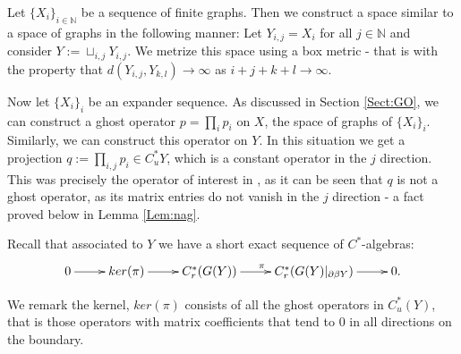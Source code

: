 \documentclass[11pt]{amsart}
\theoremstyle{plain}
\theoremstyle{definition}%
\theoremstyle{remark}%
\begin{document}
Let $\lbrace X_{i} \rbrace_{i \in \mathbb{N}}$ be a sequence of finite graphs. Then we construct a space similar to a space of graphs in the following manner: Let $Y_{i,j} = X_{i}$ for all $j \in \mathbb{N}$ and consider $Y:= \sqcup_{i,j} Y_{i,j}$. We metrize this space using a box metric - that is with the property that $d(Y_{i,j},Y_{k,l}) \rightarrow \infty$ as $i+j+k+l \rightarrow \infty$. 

Now let $\lbrace X_{i} \rbrace_{i}$ be an expander sequence. As discussed in Section \ref{Sect:GO}, we can construct a ghost operator $p= \prod_{i} p_{i}$ on $X$, the space of graphs of $\lbrace X_{i} \rbrace_{i}$. Similarly, we can construct this operator on $Y$. In this situation we get a projection $q:=\prod_{i,j}p_{i} \in C^{*}_{u}Y$, which is a constant operator in the $j$ direction. This was precisely the operator of interest in \cite{MR2363697}, as it can be seen that $q$ is not a ghost operator, as its matrix entries do not vanish in the $j$ direction - a fact proved below in Lemma \ref{Lem:nag}.

Recall that associated to $Y$ we have a short exact sequence of $C^{*}$-algebras:
\begin{equation*}
\xymatrix{
0 \ar[r] & ker(\pi) \ar[r]& C_{r}^{*}(G(Y)) \ar[r]^{\pi} & C_{r}^{*}(G(Y)|_{\partial\beta Y}) \ar[r] & 0.
}
\end{equation*}

We remark the kernel, $ker(\pi)$ consists of all the ghost operators in $C^{*}_{u}(Y)$, that is those operators with matrix coefficients that tend to $0$ in all directions on the boundary. 
\end{document}
